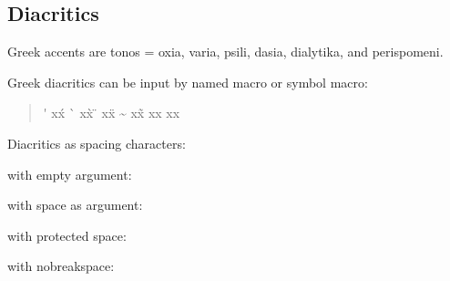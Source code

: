 \documentclass[a4paper]{article}
\begin{document}
\subsection{Diacritics}

Greek accents are
tonos = oxia, varia, psili, dasia, dialytika, and perispomeni.

Greek diacritics can be input by named macro or symbol macro:
\begin{quote}
  \acctonos\textalpha       \'\textalpha{}  \acctonos       x\'x
  \accvaria\textalpha       \`\textalpha{}  \accvaria       x\`x
  \accdialytika\textiota{}  \"\textiota{}   \accdialytika   x\"x
  \accperispomeni\textalpha \~\textalpha{}  \accperispomeni x\~x
  \accpsili\textalpha       \>\textalpha{}  \accpsili       x\>x
  \accdasia\textalpha       \<\textalpha{}  \accdasia       x\<x
\end{quote}
%
Diacritics as spacing characters:

with empty argument:
\ensuregreek{
\acctonos{} \accoxia{} \accvaria{}  
\accpsili{} \accdasia{} 
\accdialytika{} \accperispomeni{}
\accdialytikatonos{} \accdialytikavaria{} \accdialytikaperispomeni{}
\accdasiaoxia{} \accdasiavaria{} \accdasiaperispomeni{}
\accpsilioxia{} \accpsilivaria{} \accpsiliperispomeni{}
}

with space as argument:
\ensuregreek{
\acctonos{ } \accoxia{ } \accvaria{ }  
\accpsili{ } \accdasia{ } 
\accdialytika{ } \accperispomeni{ }
\accdialytikatonos{ } \accdialytikavaria{ } \accdialytikaperispomeni{ }
\accdasiaoxia{ } \accdasiavaria{ } \accdasiaperispomeni{ }
\accpsilioxia{ } \accpsilivaria{ } \accpsiliperispomeni{ }
}

with protected space:
\ensuregreek{
\acctonos{\ } \accoxia{\ } \accvaria{\ }  
\accpsili{\ } \accdasia{\ } 
\accdialytika{\ } \accperispomeni{\ }
\accdialytikatonos{\ }\ \accdialytikavaria{\ }\ \accdialytikaperispomeni{\ }\
\accdasiaoxia{\ }\ \accdasiavaria{\ }\ \accdasiaperispomeni{\ }\
\accpsilioxia{\ }\ \accpsilivaria{\ }\ \accpsiliperispomeni{\ }
}

with nobreakspace:
\ensuregreek{
\acctonos{\nobreakspace} \accoxia{\nobreakspace} \accvaria{\nobreakspace}  
\accpsili{\nobreakspace} \accdasia{\nobreakspace} 
\accdialytika{\nobreakspace} \accperispomeni{\nobreakspace}
\accdialytikatonos{\nobreakspace}\ \accdialytikavaria{\nobreakspace}\ 
\accdialytikaperispomeni{\nobreakspace}\ \accdasiaoxia{\nobreakspace}\ 
\accdasiavaria{\nobreakspace}\ \accdasiaperispomeni{\nobreakspace}\
\accpsilioxia{\nobreakspace}\ \accpsilivaria{\nobreakspace}\
\accpsiliperispomeni{\nobreakspace}
}
\end{document}
